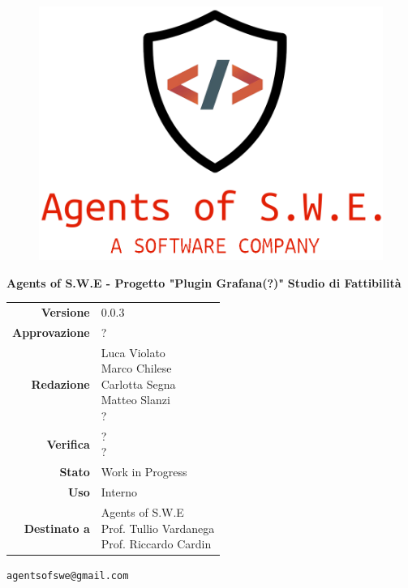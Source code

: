 


\begin{titlepage}
\thispagestyle{empty}

\begin{center}

\begin{figure}[h!]
\includegraphics[width=\linewidth]{./images/logo.png} 

\end{figure}



\large \textbf{Agents of S.W.E - Progetto "Plugin Grafana(?)"}
\vfill
\newpage
\Huge \textbf{Studio di Fattibilità}
\vfill
\large
\renewcommand{\arraystretch}{1.3}
\begin{tabular}{r|l}
\textbf{Versione} & 0.0.3\\
\textbf{Approvazione} & ?\\
\textbf{Redazione} & \parbox[t]{5cm}{Luca Violato\\Marco Chilese\\Carlotta Segna\\Matteo Slanzi\\?}\\
\textbf{Verifica} & \parbox[t]{5cm}{?\\?}\\
\textbf{Stato} & Work in Progress\\
\textbf{Uso} & Interno\\
\textbf{Destinato a} & \parbox[t]{5cm}{Agents of S.W.E \\Prof. Tullio Vardanega\\Prof. Riccardo Cardin}
\end{tabular}
\vfill
\small
\texttt{agentsofswe@gmail.com}
\end{center}
\end{titlepage}

